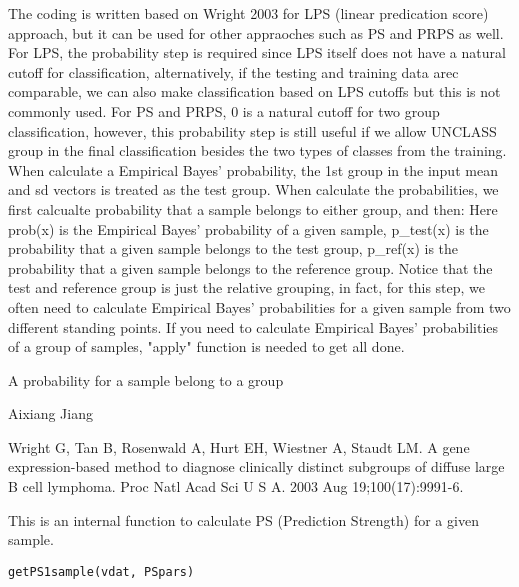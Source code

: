 \documentclass[letterpaper]{book}
\begin{document}
%
\begin{Details}\relax
The coding is written based on Wright 2003 for LPS (linear predication score) approach, 
but it can be used for other appraoches such as PS and PRPS as well. 
For LPS, the probability step is required since LPS itself does not have a natural cutoff for classification, 
alternatively, if the testing and training data arec comparable, we can also make classification based on LPS cutoffs 
but this is not commonly used. For PS and PRPS, 0 is a natural cutoff for two group classification, however, 
this probability step is still useful if we allow UNCLASS group in the final classification besides the two types 
of classes from the training.
When calculate a Empirical Bayes' probability, the 1st group in the input mean and sd vectors is treated as the test group. 
When calculate the probabilities, we first calcualte probability that a sample belongs to either group, and then:
Here prob(x) is the Empirical Bayes' probability of a given sample, p\_test(x) is the probability that a given sample 
belongs to the test group, p\_ref(x) is the probability that a given sample belongs to the reference group.
Notice that the test and reference group is just the relative grouping, in fact, for this step, 
we often need to calculate Empirical Bayes' probabilities for a given sample from two different standing points.
If you need to calculate Empirical Bayes' probabilities of a group of samples, "apply" function is needed to get all done.
\end{Details}
%
\begin{Value}
A probability for a sample belong to a group
\end{Value}
%
\begin{Author}\relax
Aixiang Jiang
\end{Author}
%
\begin{References}\relax
Wright G, Tan B, Rosenwald A, Hurt EH, Wiestner A, Staudt LM. A gene expression-based method
to diagnose clinically distinct subgroups of diffuse large B cell lymphoma. Proc Natl Acad Sci U S
A. 2003 Aug 19;100(17):9991-6.
\end{References}
%
\begin{Description}\relax
This is an internal function to calculate PS (Prediction Strength) for a given sample.
\end{Description}
%
\begin{Usage}
\begin{verbatim}
getPS1sample(vdat, PSpars)
\end{verbatim}
\end{Usage}
\end{document}
